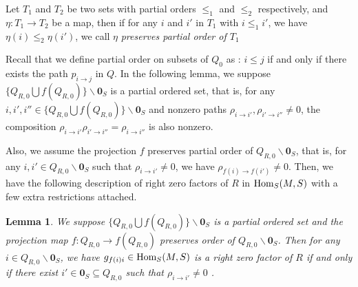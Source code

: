 \documentclass[a4paper, reqno]{amsart}
\newtheorem{lem}[thm]{Lemma}
\theoremstyle{definition}
\theoremstyle{remark}
\numberwithin{equation}{section}
\begin{document}
Let $T_1$ and $T_2$ be two sets with partial orders $\leq_{1}$ and $\leq_{2}$ respectively, and $\eta: T_1 \to T_2$ be a map, then if for any $i$ and $i'$ in $T_1$ with $i\leq_{1} i'$, we have $\eta{(i)} \leq_{2}  \eta{(i')}$, we call $\eta$ \emph{preserves partial order of $T_1$}   

Recall that we define partial order on subsets of $Q_0$ as : $i\leq j$ if and only if there exists the path $p_{i\to j}$ in $Q$. In the following lemma, we suppose $\{Q_{R,0}\bigcup f(Q_{R,0})\}\backslash \mathbf{0}_S $ is a partial ordered set, that is, for any $ i,i',i''\in \{Q_{R,0}\bigcup f(Q_{R,0})\}\backslash \mathbf{0}_S$ and nonzero paths $ \rho_{i\to i'}, \rho_{i'\to i''}\neq 0$, the composition $\rho_{i\to i'} \rho_{i'\to i''}= \rho_{i\to i''} $ is also nonzero.

Also, we assume the projection $f$ preserves partial order of $Q_{R,0}\backslash \mathbf{0}_S$, that is, for any $i,i'\in Q_{R,0} \backslash \mathbf{0}_S$ such that $\rho_{i\to i'} \neq 0$, we have $\rho_{f(i)\to f(i')} \neq 0$. Then, we have the following description of right zero factors of $R$ in $\textup{Hom}_S(M,S)$ with a few extra restrictions attached. 

\begin{lem} \label{lemma 2.8}
    We suppose $\{Q_{R,0}\bigcup f(Q_{R,0})\}\backslash \mathbf{0}_S $ is a partial ordered set and the projection map $f:Q_{R,0}\to f(Q_{R,0})$ preserves order of $Q_{R,0}\backslash \mathbf{0}_S$. Then for any $ i\in Q_{R,0}\backslash \mathbf{0}_S $, we have $g_{f(i)i}\in \textup{Hom}_S(M,S)$ is a right zero factor of $R$ if and only if there exist $i'\in \mathbf{0}_S \subseteq Q_{R,0}$ such that $\rho_{i\to i'} \neq 0 $ . 
\end{lem}
\end{document}
